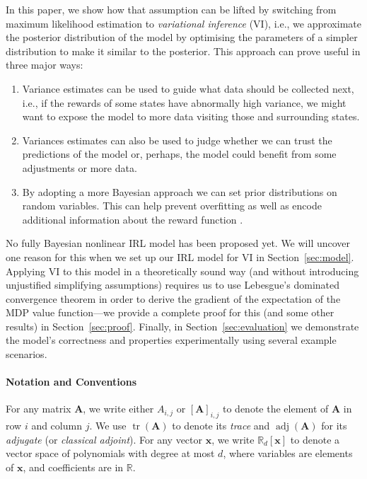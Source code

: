 \documentclass{mpaper}
\DeclareMathOperator{\adj}{adj}
\DeclareMathOperator{\tr}{tr}
\begin{document}
In this paper, we show how that assumption can be lifted by switching from
maximum likelihood estimation to \emph{variational inference} (VI), i.e., we
approximate the posterior distribution of the model by optimising the parameters
of a simpler distribution to make it similar to the posterior. This approach can
prove useful in three major ways:
\begin{enumerate}
\item Variance estimates can be used to guide what data should be collected
  next, i.e., if the rewards of some states have abnormally high variance, we
  might want to expose the model to more data visiting those and surrounding
  states.
\item Variances estimates can also be used to judge whether we can trust the
  predictions of the model or, perhaps, the model could benefit from some
  adjustments or more data.
\item By adopting a more Bayesian approach we can set prior distributions on
  random variables. This can help prevent overfitting as well as encode
  additional information about the reward function
  \cite{DBLP:conf/uai/JinDAS17}.
\end{enumerate}

No fully Bayesian nonlinear IRL model has been proposed yet. We will uncover one
reason for this when we set up our IRL model for VI in Section~\ref{sec:model}.
Applying VI to this model in a theoretically sound way (and without introducing
unjustified simplifying assumptions) requires us to use Lebesgue's dominated
convergence theorem in order to derive the gradient of the expectation of the
MDP value function---we provide a complete proof for this (and some other
results) in Section~\ref{sec:proof}. Finally, in Section~\ref{sec:evaluation} we
demonstrate the model's correctness and properties experimentally using several
example scenarios.

\paragraph{Notation and Conventions}

For any matrix $\mathbf{A}$, we write either $A_{i,j}$ or
$[\mathbf{A}]_{i,j}$ to denote the element of $\mathbf{A}$ in row $i$ and column
$j$. We use $\tr(\mathbf{A})$ to denote its \emph{trace} and $\adj(\mathbf{A})$
for its \emph{adjugate} (or \emph{classical adjoint}). For any vector
$\mathbf{x}$, we write $\mathbb{R}_d[\mathbf{x}]$ to denote a vector space of
polynomials with degree at most $d$, where variables are elements of
$\mathbf{x}$, and coefficients are in $\mathbb{R}$.
\end{document}
